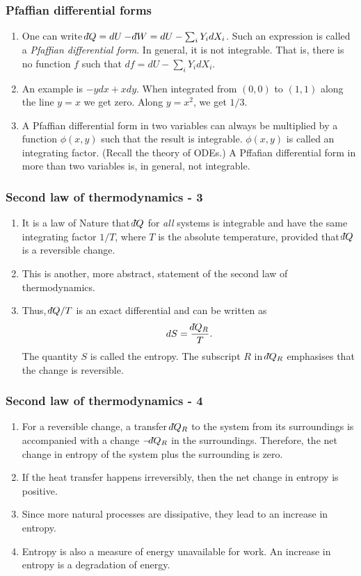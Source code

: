 \documentclass{beamer}
\newcommand{\dbar}{{\mathchar'26\mkern-13mu d}}
\begin{document}
\begin{frame}
\frametitle{Pfaffian differential forms}
\begin{enumerate}
\item One can write $\dbar Q = dU - \dbar W = dU - \sum_{i}Y_idX_i$. Such an expression is called a \emph{Pfaffian differential
form}. In general, it is not integrable. That is, there is no function $f$ such that $df = dU - \sum_{i}Y_idX_i$.
\item An example is $-ydx + xdy$. When integrated from $(0, 0)$ to $(1, 1)$ along the line $y = x$ we get zero. Along $y = x^2$,  
we get $1/3$.
\item A Pfaffian differential form in two variables can always be multiplied by a function $\phi(x, y)$ such that the result is
integrable. $\phi(x, y)$ is called an integrating factor. (Recall the theory of ODEs.) A Pffafian differential form in more
than two variables is, in general, not integrable.

\end{enumerate}
\end{frame}

\begin{frame}
\frametitle{Second law of thermodynamics - 3}
\begin{enumerate}
\item It is a law of Nature that $\dbar Q$ for \emph{all} systems is integrable and have the same integrating factor $1/T$,
where $T$ is the absolute temperature, provided that $\dbar Q$ is a reversible change. 
\item This is another, more abstract, statement of the second law of thermodynamics.
\item Thus, $\dbar Q/T$ is an exact differential and can be written as 
\[
dS = \frac{\dbar Q_R}{T}.
\]
The quantity $S$ is called the entropy. The subscript $R$ in $\dbar Q_R$ emphasises that the change is reversible.
\end{enumerate}
\end{frame}

\begin{frame}
\frametitle{Second law of thermodynamics - 4}
\begin{enumerate}
\item For a reversible change, a transfer $\dbar Q_R$ to the system from its surroundings is accompanied with a change 
$-\dbar Q_R$ in the surroundings. Therefore, the net change in entropy of the system plus the surrounding is zero.
\item If the heat transfer happens irreversibly, then the net change in entropy is positive.
\item Since more natural processes are dissipative, they lead to an increase in entropy.
\item Entropy is also a measure of energy unavailable for work. An increase in entropy is a degradation of energy.
\end{enumerate}
\end{frame}
\end{document}
